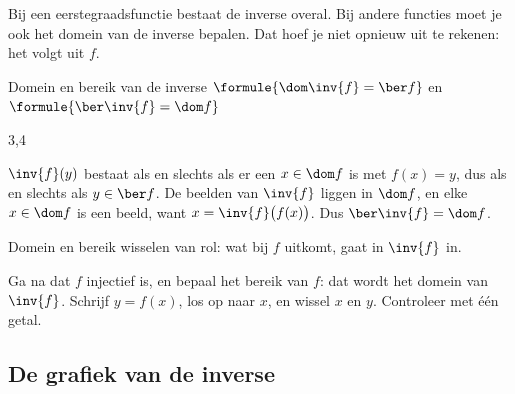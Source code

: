 Bij een eerstegraadsfunctie bestaat de inverse overal. Bij andere functies moet je ook het domein van de inverse bepalen. Dat hoef je niet opnieuw uit te rekenen: het volgt uit $f$.

\begin{theorie}
\begin{stelling}{Domein en bereik van de inverse}
\qquad $\formule{\dom \inv{f} = \ber f}$ \qquad en \qquad $\formule{\ber \inv{f} = \dom f}$
\end{stelling}

\begin{alleenvoor}{3,4}
\begin{bewijs}
$\inv{f}(y)$ bestaat als en slechts als er een $x \in \dom f$ is met $f(x) = y$, dus als en slechts als $y \in \ber f$. De beelden van $\inv{f}$ liggen in $\dom f$, en elke $x \in \dom f$ is een beeld, want $x = \inv{f}\bigl(f(x)\bigr)$. Dus $\ber \inv{f} = \dom f$.
\end{bewijs}
\end{alleenvoor}
\end{theorie}

Domein en bereik wisselen van rol: wat bij $f$ uitkomt, gaat in $\inv{f}$ in.


\begin{werkwijze}
Ga na dat $f$ injectief is, en bepaal het bereik van $f$: dat wordt het domein van $\inv{f}$. Schrijf $y = f(x)$, los op naar $x$, en wissel $x$ en $y$. Controleer met één getal.
\end{werkwijze}

\begin{oefeningen}
\end{oefeningen}

\subsection{De grafiek van de inverse}

